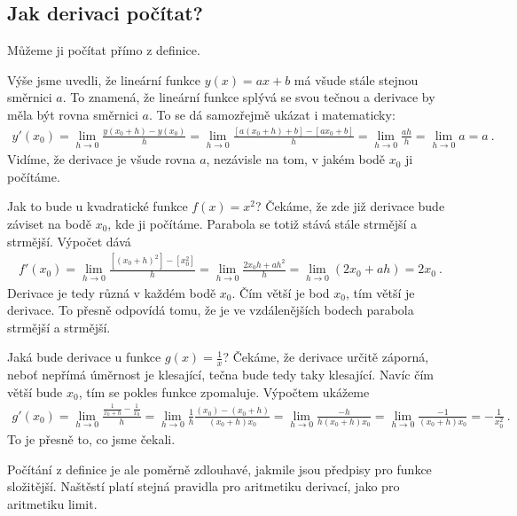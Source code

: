 \subsection*{Jak derivaci počítat?}

Můžeme ji počítat přímo z definice.

\begin{example}
    Výše jsme uvedli, že lineární funkce $y(x)=ax+b$ má všude stále stejnou směrnici $a$. To znamená, že lineární funkce splývá se svou tečnou a derivace by měla být rovna směrnici $a$. To se dá samozřejmě ukázat i matematicky:
    \begin{align}
        y'(x_0) = \lim_{h \rightarrow 0} \frac{y(x_0+h)-y(x_0)}{h} = \lim_{h \rightarrow 0} \frac{[a(x_0+h)+b]-[a x_0 + b]}{h} = 
        \lim_{h \rightarrow 0} \frac{ah}{h} = \lim_{h \rightarrow 0} a = a \:. 
    \end{align}
    Vidíme, že derivace je všude rovna $a$, nezávisle na tom, v jakém bodě $x_0$ ji počítáme.
\end{example}

\begin{example}
    Jak to bude u kvadratické funkce $f(x)=x^2$? Čekáme, že zde již derivace bude záviset na bodě $x_0$, kde ji počítáme. Parabola se totiž stává stále strmější a strmější. Výpočet dává
    \begin{align}
        f'(x_0) = \lim_{h \rightarrow 0} \frac{[(x_0+h)^2]-[x_0^2]}{h} = 
        \lim_{h \rightarrow 0} \frac{2 x_0 h + a h^2 }{h} =
        \lim_{h \rightarrow 0} (2 x_0 + ah) = 2 x_0 \:.
    \end{align}
    Derivace je tedy různá v každém bodě $x_0$. Čím větší je bod $x_0$, tím větší je derivace. To přesně odpovídá tomu, že je ve vzdálenějších bodech parabola strmější a strmější.
\end{example}

\begin{example}
    Jaká bude derivace u funkce $g(x)=\frac{1}{x}$? Čekáme, že derivace určitě záporná, neboť nepřímá úměrnost je klesající, tečna bude tedy taky klesající. Navíc čím větší bude $x_0$, tím se pokles funkce zpomaluje. Výpočtem ukážeme
    \begin{align}
        g'(x_0) = \lim_{h \rightarrow 0} \frac{\frac{1}{x_0+h}-\frac{1}{x_0}}{h} =
        \lim_{h \rightarrow 0} \frac{1}{h} \frac{(x_0)-(x_0+h)}{(x_0+h)x_0} = 
        \lim_{h \rightarrow 0} \frac{-h}{h (x_0+h) x_0} = 
        \lim_{h \rightarrow 0} \frac{-1}{(x_0+h) x_0} = -\frac{1}{x_0^2} \:.
    \end{align}
    To je přesně to, co jsme čekali.
\end{example}

Počítání z definice je ale poměrně zdlouhavé, jakmile jsou předpisy pro funkce složitější. Naštěstí platí stejná pravidla pro aritmetiku derivací, jako pro aritmetiku limit.